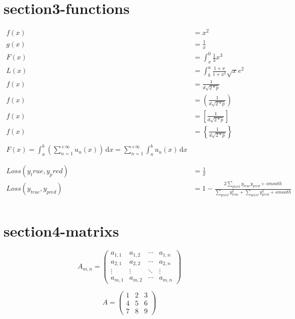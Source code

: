 \documentclass{article}
\begin{document}
\section{section3-functions}
\begin{align}
f(x)  &= x^2 \\
g(x) &= \frac{1}{x}\\
F(x) &= \int^0_x \frac{1}{3}x^3\\
L(x) &= \int^a_b \frac{1+x}{1+x^2}\sqrt{x}e^2\\
f(x) &= \frac{1}{d \sqrt{2*p}}\\
f(x) &= \left( \frac{1}{d \sqrt{2*p}} \right)\\
f(x) &= \left[ \frac{1}{d \sqrt{2*p}} \right]\\
f(x) &= \left\{ \frac{1}{d \sqrt{2*p}} \right\}\\
\\
F(x) = \int_{a}^{b}\left( \sum_{n=1}^{+\infty}u_{n}(x) \right)\,\mathrm{d}x
    =\sum_{n=1}^{+\infty}\int_{a}^{b}u_{n}(x)\,\mathrm{d}x \\
\\
\\
Loss(y_true, y_pred) &= \frac{1}{x}\\
Loss(y_{true}, y_{pred}) &= 1 - \frac{2\sum_{pixel}y_{true}y_{pred} + smooth }{\sum_{pixel}y_{true}^2 + \sum_{pixel}y_{pred}^2 + smooth}\\
\end{align}

\section{section4-matrixs}
\begin{equation}
A_{m,n} = 
\begin{pmatrix}
a_{1,1} & a_{1,2} & \cdots & a_{1,n} \\
a_{2,1} & a_{2,2} & \cdots & a_{2,n} \\
\vdots  & \vdots  & \ddots & \vdots  \\
a_{m,1} & a_{m,2} & \cdots & a_{m,n} 
\end{pmatrix}
\end{equation}

\begin{equation}
A = 
\begin{pmatrix}
1 & 2 & 3 \\
4 & 5 & 6 \\
7 & 8 & 9
\end{pmatrix}
\end{equation}
\end{document}
